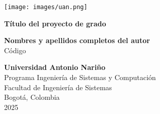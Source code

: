 \begin{titlepage}
    \begin{center}
        \texttt{[image: images/uan.png]}\\
        \vspace*{1cm}

        \Huge
        \textbf{Título del proyecto de grado}
 
        \vspace{2cm}
        
        \large
        \textbf{Nombres y apellidos completos del autor}\\
        Código
 
        \vfill
             
        \vspace{0.8cm}
             
        \textbf{Universidad Antonio Nariño}\\
        Programa Ingeniería de Sistemas y Computación\\
        Facultad de Ingeniería de Sistemas\\
        Bogotá, Colombia\\
        2025
    \end{center}
\end{titlepage}
